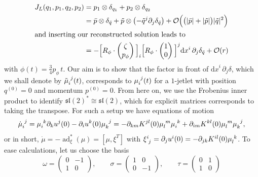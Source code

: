 \documentclass[12pt]{amsart}
\newcommand{\dx}{\ensuremath{\textrm{d}x}}
\DeclareMathOperator{\ad}{ad}
\begin{document}
\begin{align}
  J_L(q_1,p_1,q_2,p_2)
  &= p_1 \otimes \delta_{q_1} + p_2 \otimes \delta_{q_2} \notag\\
  &= \bar{p} \otimes \delta_{\bar{q}} +\tilde{p} \otimes
     \big({-\tilde{q}^j} \partial_j\delta_{\bar{q}}\big)
    +\mathcal{O}\Big(\big(|\bar{p}|+|\tilde{p}|\big)|\tilde{q}|^2\Big) \notag\\
\intertext{and inserting our reconstructed solution leads to}
  &= -\Big[R_\phi \cdot \begin{pmatrix} \zeta \\ p_\phi \end{pmatrix}\Big]_i
      \Big[R_\phi \cdot \begin{pmatrix} 1   \\ 0         \end{pmatrix}\Big]^j \dx^i\,\partial_j
      \delta_{\bar{q}} +\mathcal{O}(r) \label{eq:asymptotic-dynamics}
\end{align}
with $\phi(t) = \frac{3}{4} p_\phi\,t$. Our aim is to show that
the factor in front of $\dx^i\,\partial_j \delta$, which we shall denote
by $\tilde{\mu}\indices{_i^j}(t)$, corresponds to
$\mu\indices{_i^j}(t)$ for a $1$-jetlet with position $q^{(0)} = 0$
and momentum $p^{(0)} = 0$. From here on, we use the Frobenius inner
product to identify $\mathfrak{sl}(2)^* \cong \mathfrak{sl}(2)$, which
for explicit matrices corresponds to taking the transpose.
For such a setup we have equations of motion
\begin{equation*}
  \dot{\mu}\indices{_i^j}
  = \mu\indices{_i^k} \partial_k u^j(0) - \partial_i u^k(0) \mu\indices{_k^j}
  = -\partial_{km} K^{jl}(0) \mu\indices{_l^m} \mu\indices{_i^k}
    +\partial_{im} K^{kl}(0) \mu\indices{_l^m} \mu\indices{_k^j},
\end{equation*}
or in short, $\dot{\mu} = -\ad^*_\xi(\mu) = [\mu,\xi^T]$ with
$\xi\indices{^i_j} = \partial_j u^i(0) = -\partial_{jk} K^{i l}(0) \mu\indices{_l^k}$.
To ease calculations, let us choose the basis
\begin{equation*}\label{eq:basis-sl2}
  \omega = \begin{pmatrix}
    0 & -1 \\
    1 & 0
  \end{pmatrix},\qquad
  \sigma = \begin{pmatrix}
    1 & 0 \\
    0 & -1
  \end{pmatrix},\qquad
  \tau = \begin{pmatrix}
    0 & 1 \\
    1 & 0
  \end{pmatrix}
\end{equation*}
\end{document}
